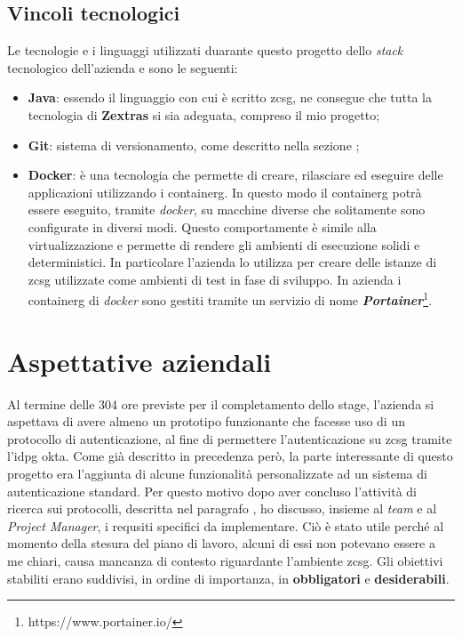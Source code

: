    \subsection{Vincoli tecnologici}
    Le tecnologie e i linguaggi utilizzati duarante questo progetto dello \textit{stack} tecnologico dell'azienda e sono le seguenti:
    \begin{itemize}
        \item \textbf{Java}: essendo il linguaggio con cui è scritto \gls{zcsg}, ne consegue che tutta la tecnologia di \textbf{Zextras} si sia adeguata, compreso il mio progetto;
        \item \textbf{Git}: sistema di versionamento, come descritto nella sezione ;
        \item \textbf{Docker}: è una tecnologia che permette di creare, rilasciare ed eseguire delle applicazioni utilizzando i \gls{containerg}. In questo modo il \gls{containerg} potrà essere eseguito, tramite \textit{docker}, su macchine diverse che solitamente sono configurate in diversi modi. Questo comportamente è simile alla virtualizzazione e permette di rendere gli ambienti di esecuzione solidi e deterministici. In particolare l'azienda lo utilizza per creare delle istanze di \gls{zcsg} utilizzate come ambienti di test in fase di sviluppo. In azienda i \gls{containerg} di \textit{docker} sono gestiti tramite un servizio di nome \textbf{\textit{Portainer}}\footnote{https://www.portainer.io/}.
    \end{itemize}

\section{Aspettative aziendali}
Al termine delle 304 ore previste per il completamento dello stage, l'azienda si aspettava di avere almeno un prototipo funzionante che facesse uso di un protocollo di autenticazione, al fine di permettere l'autenticazione su \gls{zcsg} tramite l'\gls{idpg} \gls{okta}. Come già descritto in precedenza però, la parte interessante di questo progetto era l'aggiunta di alcune funzionalità personalizzate ad un sistema di autenticazione standard. Per questo motivo dopo aver concluso l'attività di ricerca sui protocolli, descritta nel paragrafo , ho discusso, insieme al \textit{team} e al \textit{Project Manager}, i requsiti specifici da implementare. Ciò è stato utile perché al momento della stesura del piano di lavoro, alcuni di essi non potevano essere a me chiari, causa mancanza di contesto riguardante l'ambiente \gls{zcsg}. Gli obiettivi stabiliti erano suddivisi, in ordine di importanza, in \textbf{obbligatori} e \textbf{desiderabili}.
